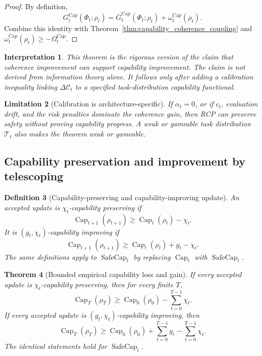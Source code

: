 \documentclass[11pt]{article}
\newtheorem{theorem}{Theorem}[section]
\newtheorem{definition}[theorem]{Definition}
\newtheorem{interpretation}[theorem]{Interpretation}
\newtheorem{limitation}[theorem]{Limitation}
\newcommand{\Ccal}{\mathcal{C}}
\newcommand{\1}{\mathbf{1}}
\renewcommand{\Cap}{\operatorname{Cap}}
\providecommand{\Tcal}{\mathcal{T}}
\providecommand{\SafeCap}{\operatorname{SafeCap}}
\begin{document}
\begin{proof}
By definition,
\[
G^{\Cap}_t(\Phi_t;\rho_t)
=
\overline G^{\Cap}_t(\Phi_t;\rho_t)+\omega_t^{\Cap}(\rho_t).
\]
Combine this identity with Theorem~\ref{thm:capability_coherence_coupling} and \(\omega_t^{\Cap}(\rho_t)\ge-\Omega_t^{\Cap}\).
\end{proof}

\begin{interpretation}
This theorem is the rigorous version of the claim that coherence improvement can support capability improvement.  The claim is not derived from information theory alone.  It follows only after adding a calibration inequality linking \(\Delta\Ccal_t\) to a specified task-distribution capability functional.
\end{interpretation}

\begin{limitation}[Calibration is architecture-specific]
If \(\alpha_t=0\), or if \(c_t\), evaluation drift, and the risk penalties dominate the coherence gain, then RCP can preserve safety without proving capability progress.  A weak or gameable task distribution \(\Tcal_t\) also makes the theorem weak or gameable.
\end{limitation}

\subsection{Capability preservation and improvement by telescoping}
\label{subsec:capability_telescope_module}

\begin{definition}[Capability-preserving and capability-improving update]
An accepted update is \(\chi_t\)-capability preserving if
\[
\Cap_{t+1}(\rho_{t+1})
\ge
\Cap_t(\rho_t)-\chi_t.
\]
It is \((g_t,\chi_t)\)-capability improving if
\[
\Cap_{t+1}(\rho_{t+1})
\ge
\Cap_t(\rho_t)+g_t-\chi_t.
\]
The same definitions apply to \(\SafeCap_t\) by replacing \(\Cap_t\) with \(\SafeCap_t\).
\end{definition}

\begin{theorem}[Bounded empirical capability loss and gain]
\label{thm:capability_telescope}
If every accepted update is \(\chi_t\)-capability preserving, then for every finite \(T\),
\[
\Cap_T(\rho_T)
\ge
\Cap_0(\rho_0)-\sum_{t=0}^{T-1}\chi_t.
\]
If every accepted update is \((g_t,\chi_t)\)-capability improving, then
\[
\Cap_T(\rho_T)
\ge
\Cap_0(\rho_0)+\sum_{t=0}^{T-1}g_t-
\sum_{t=0}^{T-1}\chi_t.
\]
The identical statements hold for \(\SafeCap_t\).
\end{theorem}
\end{document}
